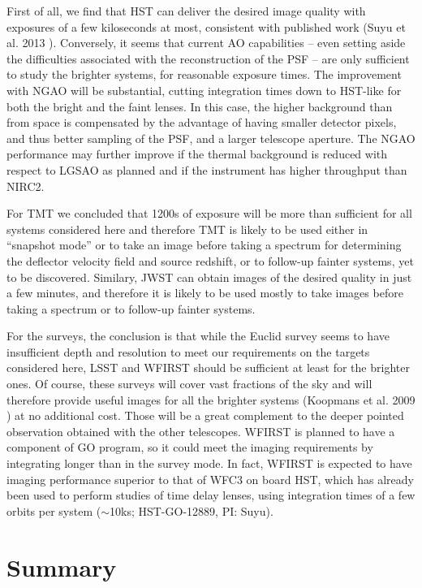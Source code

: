 \documentclass[a4paper,11pt]{article}
\begin{document}
First of all, we find that HST can deliver the desired image quality
with exposures of a few kiloseconds at most, consistent with published work
(Suyu et al. 2013 \cite{2013ApJ...766...70S}). Conversely, it seems
that current AO capabilities -- even setting aside the difficulties
associated with the reconstruction of the PSF -- are only sufficient
to study the brighter systems, for reasonable exposure times. The
improvement with NGAO will be substantial, cutting integration times
down to HST-like for both the bright and the faint lenses. In this
case, the higher background than from space is compensated by the
advantage of having smaller detector pixels, and thus better sampling
of the PSF, and a larger telescope aperture. The NGAO performance may
further improve if the thermal background is reduced with respect to
LGSAO as planned and if the instrument has higher throughput than
NIRC2.

For TMT we concluded that 1200s of exposure will be more than
sufficient for all systems considered here and therefore TMT is likely
to be used either in ``snapshot mode'' or to take an image before taking
a spectrum for determining the deflector velocity field and source
redshift, or to follow-up fainter systems, yet to be
discovered. Similary, JWST can obtain images of the desired quality in
just a few minutes, and therefore it is likely to be used mostly to
take images before taking a spectrum or to follow-up fainter systems.

For the surveys, the conclusion is that while the Euclid survey seems
to have insufficient depth and resolution to meet our requirements on
the targets considered here, LSST and WFIRST should be sufficient at
least for the brighter ones. Of course, these surveys will cover vast
fractions of the sky and will therefore provide
useful images for all the brighter systems
(Koopmans et al. 2009 \cite{2009astro2010S.159K}) at no additional cost.
Those will be a great complement to the
deeper pointed observation obtained with the other telescopes. WFIRST
is planned to have a component of GO program, so it could meet the
imaging requirements by integrating longer than in the survey mode. In
fact, WFIRST is expected to have imaging performance superior to that
of WFC3 on board HST, which has already been used to perform studies
of time delay lenses, using integration times of a few orbits per
system ($\sim$10ks; HST-GO-12889, PI: Suyu).

\section{Summary}
\end{document}
